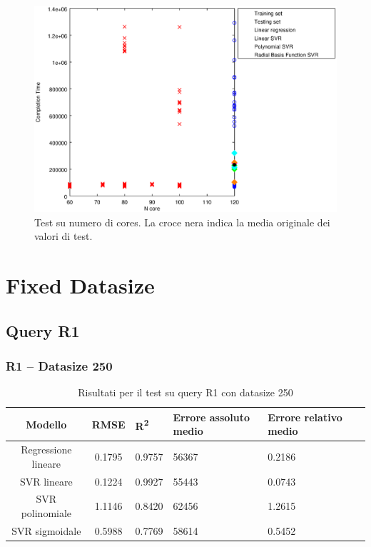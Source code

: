 \documentclass[a4paper,11pt]{article}
\begin{document}
\begin {figure}[hbtp]
\centering
\includegraphics[width=\textwidth]{outputPlots/plot_Ncore.eps}
\caption {Test su numero di cores. La croce nera indica la media originale dei valori di test.}
\end {figure}

\newpage
\section{Fixed Datasize}

\subsection{Query R1}

\subsubsection{R1 -- Datasize 250}
\begin{table}[bhpt]
	\centering
	\begin{adjustbox}{center}
		\begin{tabular}{c | c M{1cm} M{2.5cm} M{2.5cm} M{1.8cm}}
			Modello & RMSE & R\textsuperscript{2} & Errore assoluto medio & Errore relativo medio \tabularnewline
			\hline
			Regressione lineare & 0.1795 & 0.9757 &  56367 & 0.2186 \\
			SVR lineare & 0.1224 & 0.9927 &  55443 & 0.0743 \\
			SVR polinomiale & 1.1146 & 0.8420 &  62456 & 1.2615 \\
			SVR sigmoidale & 0.5988 & 0.7769 &  58614 & 0.5452 \\
		\end{tabular}
	\end{adjustbox}
	\\
	\caption{Risultati per il test su query R1 con datasize 250}
	\label{table_R1_250}
\end{table}
\end{document}

